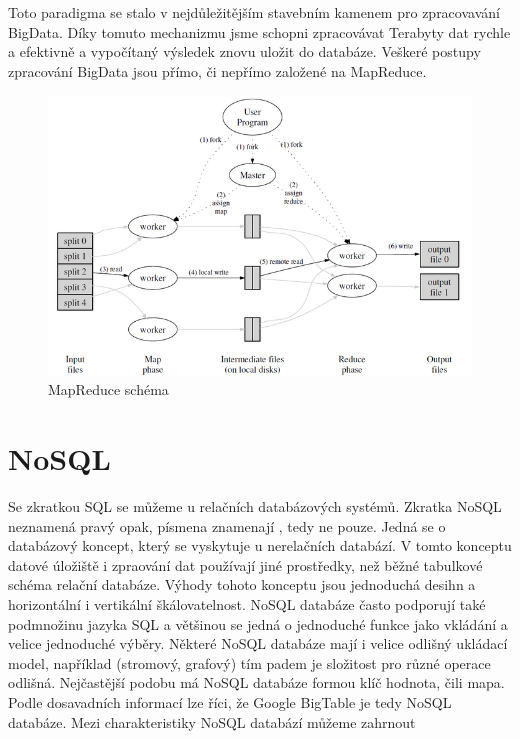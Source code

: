 Toto paradigma se stalo v nejdůležitějším stavebním kamenem pro zpracovavání BigData. Díky tomuto mechanizmu jsme schopni zpracovávat Terabyty dat rychle a efektivně a vypočítaný výsledek znovu uložit do databáze. Veškeré postupy zpracování BigData jsou přímo, či nepřímo založené na MapReduce. 

\begin{figure}[!h]
\includegraphics[scale=0.6]{images/mapreduce}
\caption{MapReduce schéma \cite{mapreduce}}
\label{fig:mapreduce}
\end{figure}

\newpage

\section{NoSQL}
Se zkratkou SQL se můžeme u relačních databázových systémů. Zkratka NoSQL neznamená pravý opak, písmena  znamenají , tedy ne pouze. Jedná se o databázový koncept, který se vyskytuje u nerelačních databází. V tomto konceptu datové úložiště i zpraování dat používají jiné prostředky, než běžné tabulkové schéma relační databáze. Výhody tohoto konceptu jsou jednoduchá desihn a horizontální i vertikální škálovatelnost. NoSQL databáze často podporují také podmnožinu jazyka SQL a většinou se jedná o jednoduché funkce jako vkládání a velice jednoduché výběry. Některé NoSQL databáze mají i velice odlišný ukládací model, například (stromový, grafový) tím padem je složitost  pro různé operace odlišná. Nejčastější podobu má NoSQL databáze formou klíč hodnota, čili mapa. Podle dosavadních informací lze říci, že Google BigTable je tedy NoSQL databáze. Mezi charakteristiky NoSQL databází můžeme zahrnout


